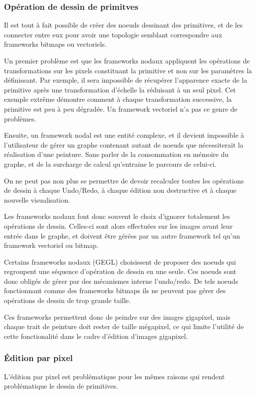 			\subsubsection{Opération de dessin de primitves}
				Il est tout à fait possible de créer des noeuds dessinant des primitives, et de les connecter entre eux pour avoir une topologie
				semblant correspondre aux frameworks bitmaps ou vectoriels. 

				Un premier problème est que les frameworks nodaux appliquent les opérations de transformations sur les pixels constituant la primitive et non sur les paramètres la définissant.
				Par exemple, il sera impossible de récupérer l'apparence exacte de la primitive après une transformation d'échelle 
				la réduisant à un seul pixel. Cet exemple extrême démontre comment à chaque transformation successive, la primitive est peu à peu
				dégradée. Un framework vectoriel n'a pas ce genre de problèmes.
				
				Ensuite, un framework nodal est une entité complexe, et il devient impossible à l'utilisateur de gérer un graphe contenant 
				autant de noeuds que nécessiterait la réalisation d'une peinture. Sans parler de la consommation en mémoire du graphe, 
				et de la surcharge de calcul qu'entraine le parcours de celui-ci.

				On ne peut pas non plus se permettre de devoir recalculer toutes les opérations de dessin à chaque Undo/Redo, à chaque édition
				non destructive et à chaque nouvelle visualisation.

				Les frameworks nodaux font donc souvent le choix d'ignorer totalement les opérations de dessin. Celles-ci sont alors effectuées
				sur les images avant leur entrée dans le graphe, et doivent être gérées par un autre framework tel qu'un framework vectoriel ou bitmap.

				Certains frameworks nodaux (GEGL) choisissent de proposer des noeuds qui regroupent une séquence d'opération de dessin en une seule.
				Ces noeuds sont donc obligés de gérer par des mécanismes interne l'undo/redo. De tels noeuds fonctionnant comme des frameworks bitmaps
				ils ne peuvent pas gérer des opérations de dessin de trop grande taille. 
				
				Ces frameworks permettent donc de peindre sur des images gigapixel, mais chaque trait de peinture doit rester de taille mégapixel,
				ce qui limite l'utilité de cette fonctionalité dans le cadre d'édition d'images gigapixel.


			\subsubsection{Édition par pixel}
				L'édition par pixel est problématique pour les mêmes raisons qui rendent problématique le dessin de primitives.
